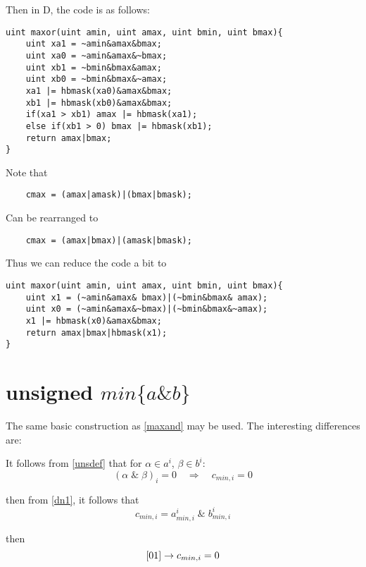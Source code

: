 \documentclass{article}
\begin{document}
Then in D, the code is as follows:
\begin{lstlisting}
uint maxor(uint amin, uint amax, uint bmin, uint bmax){
    uint xa1 = ~amin&amax&bmax;
    uint xa0 = ~amin&amax&~bmax;
    uint xb1 = ~bmin&bmax&amax;
    uint xb0 = ~bmin&bmax&~amax;
    xa1 |= hbmask(xa0)&amax&bmax;
    xb1 |= hbmask(xb0)&amax&bmax;
    if(xa1 > xb1) amax |= hbmask(xa1);
    else if(xb1 > 0) bmax |= hbmask(xb1);
    return amax|bmax;
}
\end{lstlisting}

Note that 

\begin{lstlisting}
    cmax = (amax|amask)|(bmax|bmask);
\end{lstlisting}

Can be rearranged to

\begin{lstlisting}
    cmax = (amax|bmax)|(amask|bmask);
\end{lstlisting}

Thus we can reduce the code a bit to
\begin{lstlisting}
uint maxor(uint amin, uint amax, uint bmin, uint bmax){
    uint x1 = (~amin&amax& bmax)|(~bmin&bmax& amax);
    uint x0 = (~amin&amax&~bmax)|(~bmin&bmax&~amax);
    x1 |= hbmask(x0)&amax&bmax;
    return amax|bmax|hbmask(x1);
}
\end{lstlisting}


\section{unsigned $min \{a\&b\}$}

The same basic construction as \ref{maxand} may be used. 
The interesting differences are:

It follows from \eqref{unsdef} that for $\alpha \in a^i$, $\beta \in b^i$:
\begin{equation}
(\alpha \; \text{\&} \; \beta)_i = 0
\quad \Rightarrow \quad c_{min,i} = 0
\end{equation}

then from \eqref{dn1}, it follows that 
\begin{equation}\label{minand}
c_{min,i} = a^i_{min,i} \; \text{\&}\; b^i_{min,i}
\end{equation}

then
\begin{equation*}
\eqref{01} \rightarrow c_{min,i} = 0
\end{equation*}
\end{document}
